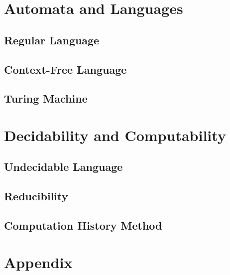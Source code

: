 \documentclass[11pt,fleqn,dvipsnames]{book} %
\begin{document}
\pagestyle{fancy} %

\setlength{\parskip}{1em}

\part{Automata and Languages}

\chapter{Regular Language}


\chapter{Context-Free Language}


\chapter{Turing Machine}


\part{Decidability and Computability}

\chapter{Undecidable Language}


\chapter{Reducibility}


\chapter{Computation History Method}


\part*{Appendix}
\appendix
\end{document}
